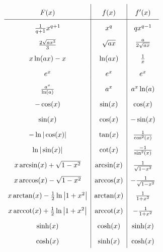\documentclass[6pt,a4paper]{scrartcl}
\DeclareMathOperator{\arccot}{arccot}
\begin{document}
\begin{multicols*}{2}
\begin{multicols}{2}
\everymath{\displaystyle}	%
\begin{math}\renewcommand{\arraystretch}{1.8}
\begin{array}{c|c|c}
F(x) & f(x) & f'(x) \\ \hline
\frac{1}{q+1}x^{q+1} & x^q & qx^{q-1} \\
\raisebox{-0.2em}{$\frac{2\sqrt{ax^3}}{3}$} & \sqrt{ax} & \raisebox{0.2em}{$\frac{a}{2\sqrt{ax}}$}\\
x\ln(ax) -x & \ln(ax) & \textstyle \frac{1}{x}\\
e^x & e^x & e^x \\
\frac{a^x}{\ln(a)} & a^x & a^x \ln(a) \\
-\cos(x) & \sin(x) & \cos(x)\\
\sin(x) & \cos(x) & -\sin(x)\\
-\ln |\cos(x)| & \tan(x) & \frac{1}{\cos^2(x)} \\
\ln |\sin(x)| & \cot(x) & \frac{-1}{\sin^2(x)} \\
x\arcsin (x)+\sqrt{1-x^2} & \arcsin(x) & \frac{1}{\sqrt{1-x^2}}\\
x\arccos (x)-\sqrt{1-x^2} & \arccos(x) & -\frac{1}{\sqrt{1-x^2}}\\
x\arctan (x)-\frac{1}{2} \ln \left| 1+ x^2 \right| & \arctan (x) & \frac{1}{1+x^2} \\
x\arccot (x)+\frac{1}{2} \ln \left| 1+ x^2 \right| & \arccot (x) & -\frac{1}{1+x^2} \\
\sinh(x) & \cosh(x) & \sinh (x) \\
\cosh(x) & \sinh(x) & \cosh (x)\\
\end{array}
\end{math}
\everymath{\textstyle}
\end{multicols}

\end{multicols*}


\end{document}
